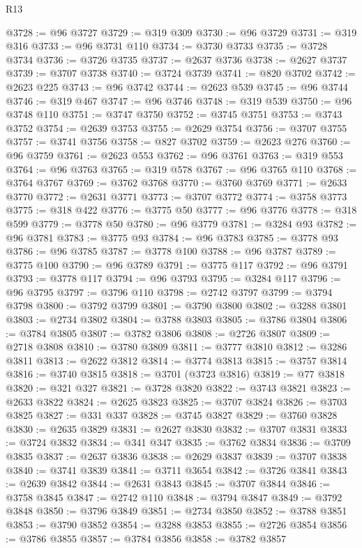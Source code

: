 \begin{lexlean}{R13}
\begin{coremodule}
@3728 := @96 @3727
@3729 := @319 @309
@3730 := @96 @3729
@3731 := @319 @316
@3733 := @96 @3731 @110
@3734 := @3730 @3733
@3735 := @3728 @3734
@3736 := @3726 @3735
@3737 := @2637 @3736
@3738 := @2627 @3737
@3739 := @3707 @3738
@3740 := @3724 @3739
@3741 := @820 @3702
@3742 := @2623 @225
@3743 := @96 @3742
@3744 := @2623 @539
@3745 := @96 @3744
@3746 := @319 @467
@3747 := @96 @3746
@3748 := @319 @539
@3750 := @96 @3748 @110
@3751 := @3747 @3750
@3752 := @3745 @3751
@3753 := @3743 @3752
@3754 := @2639 @3753
@3755 := @2629 @3754
@3756 := @3707 @3755
@3757 := @3741 @3756
@3758 := @827 @3702
@3759 := @2623 @276
@3760 := @96 @3759
@3761 := @2623 @553
@3762 := @96 @3761
@3763 := @319 @553
@3764 := @96 @3763
@3765 := @319 @578
@3767 := @96 @3765 @110
@3768 := @3764 @3767
@3769 := @3762 @3768
@3770 := @3760 @3769
@3771 := @2633 @3770
@3772 := @2631 @3771
@3773 := @3707 @3772
@3774 := @3758 @3773
@3775 := @318 @422
@3776 := @3775 @50
@3777 := @96 @3776
@3778 := @318 @599
@3779 := @3778 @50
@3780 := @96 @3779
@3781 := @3284 @93
@3782 := @96 @3781
@3783 := @3775 @93
@3784 := @96 @3783
@3785 := @3778 @93
@3786 := @96 @3785
@3787 := @3778 @100
@3788 := @96 @3787
@3789 := @3775 @100
@3790 := @96 @3789
@3791 := @3775 @117
@3792 := @96 @3791
@3793 := @3778 @117
@3794 := @96 @3793
@3795 := @3284 @117
@3796 := @96 @3795
@3797 := @3796 @110
@3798 := @2742 @3797
@3799 := @3794 @3798
@3800 := @3792 @3799
@3801 := @3790 @3800
@3802 := @3288 @3801
@3803 := @2734 @3802
@3804 := @3788 @3803
@3805 := @3786 @3804
@3806 := @3784 @3805
@3807 := @3782 @3806
@3808 := @2726 @3807
@3809 := @2718 @3808
@3810 := @3780 @3809
@3811 := @3777 @3810
@3812 := @3286 @3811
@3813 := @2622 @3812
@3814 := @3774 @3813
@3815 := @3757 @3814
@3816 := @3740 @3815
@3818 := @3701 (@3723 @3816)
@3819 := @77 @3818
@3820 := @321 @327
@3821 := @3728 @3820
@3822 := @3743 @3821
@3823 := @2633 @3822
@3824 := @2625 @3823
@3825 := @3707 @3824
@3826 := @3703 @3825
@3827 := @331 @337
@3828 := @3745 @3827
@3829 := @3760 @3828
@3830 := @2635 @3829
@3831 := @2627 @3830
@3832 := @3707 @3831
@3833 := @3724 @3832
@3834 := @341 @347
@3835 := @3762 @3834
@3836 := @3709 @3835
@3837 := @2637 @3836
@3838 := @2629 @3837
@3839 := @3707 @3838
@3840 := @3741 @3839
@3841 := @3711 @3654
@3842 := @3726 @3841
@3843 := @2639 @3842
@3844 := @2631 @3843
@3845 := @3707 @3844
@3846 := @3758 @3845
@3847 := @2742 @110
@3848 := @3794 @3847
@3849 := @3792 @3848
@3850 := @3796 @3849
@3851 := @2734 @3850
@3852 := @3788 @3851
@3853 := @3790 @3852
@3854 := @3288 @3853
@3855 := @2726 @3854
@3856 := @3786 @3855
@3857 := @3784 @3856
@3858 := @3782 @3857

\end{coremodule}
\end{lexlean}
